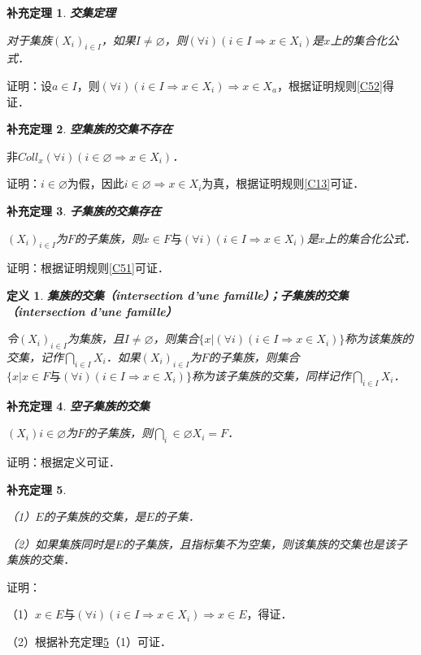 \documentclass[12pt, a4paper, oneside]{book}
\newtheorem{cor}{补充定理}
\newtheorem{de}{定义}
\begin{document}
			\begin{cor}\label{cor92}
				\textbf{交集定理}
				\par
				对于集族$(X_i)_{i\in I}$，如果$I\neq \varnothing$，则$(\forall i)(i\in I\Rightarrow x\in X_i)$是$x$上的集合化公式．
			\end{cor}
			证明：设$a\in I$，则$(\forall i)(i\in I\Rightarrow x\in X_i) \Rightarrow x\in X_a$，根据证明规则\ref{C52}得证．
						
			\begin{cor}\label{cor93}
				\textbf{空集族的交集不存在}
				\par
				$\text{非}Coll_x(\forall i)(i\in \varnothing\Rightarrow x\in X_i)$．
			\end{cor}
			证明：$i\in \varnothing$为假，因此$i\in \varnothing\Rightarrow x\in X_i$为真，根据证明规则\ref{C13}可证．
			
			\begin{cor}\label{cor94}
				\textbf{子集族的交集存在}
				\par
				$(X_i)_{i\in I}$为$F$的子集族，则$x\in F\text{与}(\forall i)(i\in I\Rightarrow x\in X_i)$是$x$上的集合化公式．
			\end{cor}
			证明：根据证明规则\ref{C51}可证．

			\begin{de}
				\textbf{集族的交集（intersection d'une famille）；子集族的交集（intersection d'une famille）}
				\hfill\par
				令$(X_i)_{i\in I}$为集族，且$I\neq \varnothing$，则集合$\{x|(\forall i)(i\in I\Rightarrow x\in X_i)\}$称为该集族的交集，记作$\bigcap\limits_{i\in I}X_i$．如果$(X_i)_{i\in I}$为$F$的子集族，则集合$\{x|x\in F\text{与}(\forall i)(i\in I\Rightarrow x\in X_i)\}$称为该子集族的交集，同样记作$\bigcap\limits_{i\in I}X_i$．
			\end{de}
			
			\begin{cor}\label{cor95}
				\textbf{空子集族的交集}
				\par
				$(X_i)i\in \varnothing$为$F$的子集族，则$\bigcap\limits_i\in \varnothing X_i=F$．
			\end{cor}
			证明：根据定义可证．
			
			\begin{cor}\label{cor96}
				\hfill\par
				（1）$E$的子集族的交集，是$E$的子集．
				\par
				（2）如果集族同时是E的子集族，且指标集不为空集，则该集族的交集也是该子集族的交集．
			\end{cor}
			证明：
			\par
			（1）$x\in E\text{与}(\forall i)(i\in I\Rightarrow x\in X_i)\Rightarrow x\in E$，得证．
			\par
			（2）根据补充定理\ref{cor96}（1）可证．
\end{document}
